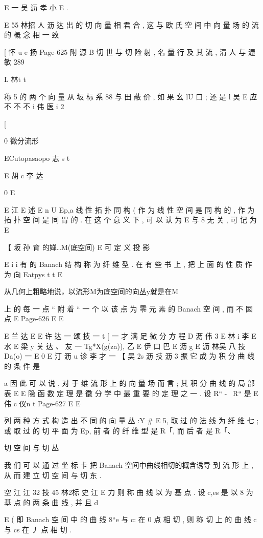E 一 吴 沥 孝 小
E .

E 55 林招 人
沥 达
出 的 切 向 量 相 君 合 , 这 与 欧 氏 空 间 中 向 量 场 的 流 的 概 念 相 一 致

[ 怀 u e 扬
Page-625
附 源 B 切 世 与 切 险 射 , 名 量 行 及 其 流 , 清 人 与 渥 敏 289

L 林t t

称 5 的 两 个 向 量 从 坂 标 系 88 与 田 蔽 价 , 如 果 幺 lU 口 ; 还 是
l 吴
E 应 不 不 不 i
伟
医 i 2

[

0 微分流形

ECutopasaopo 志 s t

E 胡 c 李
达

0
E

E 江
E 述
E n U
Ep,a 线 性 拓 扑 同 构 ( 作 为 线 性 空 间 是 同 构 的 , 作 为 拓 扑 空 间 是 同
胃 的 . 在 这 个 意 义 下 , 可 以 认 为 E 与 8 无 关 , 可 记 为 E

【 坂 孙 育 的婵…M(底空间) E
可 定 义 投 影

E i
i
有 的 Banach 结 构 称 为 纤 维 型 . 在 有 些 书 上 , 把 上 面 的 性 质 作 为 向
Eatpys t t
E

从几何上粗略地说，以流形M为底空间的向丛y就是在M

上 的 每 一 点 “ 附 着 “ 一 个 以 该 点 为 零 元 素 的 Banach 空 间 , 而 不 囡 点
E
Page-626
E E

E 兰 达
E
E 许 达 一 颂 技 一 t
[ 一 才
满 足 微 分 方 程
D 沥 伟 3
E 林 i 李
E 水
E 梁 y 关 达
、 友 一 Tg*X(g(za)), 乙 E 伊 口 巴
E 沥 g
E 沥 林吴 八 技
Da(o) 一 E 0
E 汀 沥
u 诊 李 才 一
【 吴 2s 沥 技 沥 3 振
它 成 为 积 分 曲 线 的 条 件 是

a
因 此 可 以 说 , 对 于 维 流 形 上 的 向 量 场 而 言 ; 其 积 分 曲 线 的 局 部 表
E
E
隐 函 数 定 理 是 徽 分 学 中 最 重 要 的 定 理 之 一 . 设 R“ -~ R“ 是
E 伟 c 仪n t
Page-627
E E

列 两 种 方 式 构 造 出 不 同 的 向 量 丛 :Y # E 5, 取 过 的 法 线 为 纤 维
七 ; 或 取 过 的 切 平 面 为 Ep, 前 者 的 纤 维 型 是 R「, 而 后 者 是 R「、

切 空 间 与 切 丛

我 们 可 以 通 过 坐 标 卡 把 Banach 空间中曲线相切的概含诱导
到 流 形 上 , 从 而 建 立 切 空 间 与 切 东 .

空
江 江 32 技 45 林2标 史 江 E
力 则 称 曲 线 以 为 基 点 . 设 c,es 是 以 8 为 基 点 的 两 条 曲 线 , 并 且
d

E
( 即 Banach 空 间 中 的 曲 线 8“e 与 c: 在 0 点 相 切 , 则 称 切 上 的
曲 线 c 与 cs 在 丿 点 相 切 .

